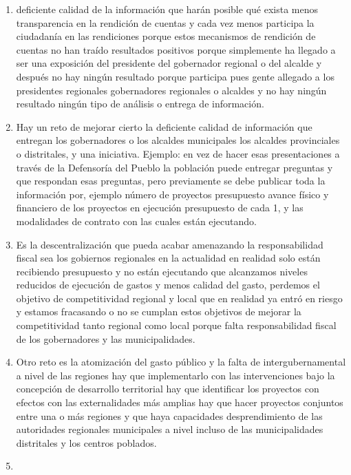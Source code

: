 \documentclass[
  jou,
  floatsintext,
  longtable,
  a4paper,
  nolmodern,
  notxfonts,
  notimes,
  12pt,
  colorlinks=true,linkcolor=blue,citecolor=blue,urlcolor=blue]{apa7}
\begin{document}
\begin{enumerate}
\def\labelenumi{\arabic{enumi}.}
\setcounter{enumi}{3}
\item
  deficiente calidad de la información que harán posible qué exista
  menos transparencia en la rendición de cuentas y cada vez menos
  participa la ciudadanía en las rendiciones porque estos mecanismos de
  rendición de cuentas no han traído resultados positivos porque
  simplemente ha llegado a ser una exposición del presidente del
  gobernador regional o del alcalde y después no hay ningún resultado
  porque participa pues gente allegado a los presidentes regionales
  gobernadores regionales o alcaldes y no hay ningún resultado ningún
  tipo de análisis o entrega de información.
\item
  Hay un reto de mejorar cierto la deficiente calidad de información que
  entregan los gobernadores o los alcaldes municipales los alcaldes
  provinciales o distritales, y una iniciativa. Ejemplo: en vez de hacer
  esas presentaciones a través de la Defensoría del Pueblo la población
  puede entregar preguntas y que respondan esas preguntas, pero
  previamente se debe publicar toda la información por, ejemplo número
  de proyectos presupuesto avance físico y financiero de los proyectos
  en ejecución presupuesto de cada 1, y las modalidades de contrato con
  las cuales están ejecutando.
\item
  Es la descentralización que pueda acabar amenazando la responsabilidad
  fiscal sea los gobiernos regionales en la actualidad en realidad solo
  están recibiendo presupuesto y no están ejecutando que alcanzamos
  niveles reducidos de ejecución de gastos y menos calidad del gasto,
  perdemos el objetivo de competitividad regional y local que en
  realidad ya entró en riesgo y estamos fracasando o no se cumplan estos
  objetivos de mejorar la competitividad tanto regional como local
  porque falta responsabilidad fiscal de los gobernadores y las
  municipalidades.
\item
  Otro reto es la atomización del gasto público y la falta de
  intergubernamental a nivel de las regiones hay que implementarlo con
  las intervenciones bajo la concepción de desarrollo territorial hay
  que identificar los proyectos con efectos con las externalidades más
  amplias hay que hacer proyectos conjuntos entre una o más regiones y
  que haya capacidades desprendimiento de las autoridades regionales
  municipales a nivel incluso de las municipalidades distritales y los
  centros poblados.
\item

\end{enumerate}
\end{document}
